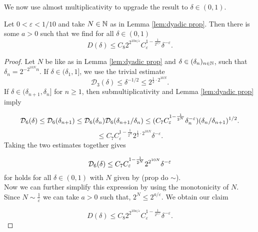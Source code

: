 We now use almost multiplicativity to upgrade the result to $\delta \in(0,1)$. 
\begin{lem}\label{lem:iteration prop}
Let $0<\varepsilon<1/10$ and take $N\in\mathbb{N}$ as in Lemma \ref{lem:dyadic prop}. Then there is some $a >0$ such that we find for all $\delta \in (0,1)$
\begin{equation}
\label{eq:IntermediateResultIIMomentCurve}
D(\delta) \leq C_{8} 2^{2^{10 a/\varepsilon}} C_\varepsilon^{1-\frac{1}{2^{a/\varepsilon}}} \delta^{-\varepsilon}.
\end{equation}
\end{lem}

\begin{proof}
Let $N$ be like as in Lemma \ref{lem:dyadic prop} and $\delta \in (\delta_n)_{n\in\mathbb{N}}$, such that $\delta_n = 2^{-2^{10N}n}$. If $\delta \in (\delta_{1},1]$, we use the trivial estimate
\begin{equation*}
\mathcal{D}_3(\delta) \leq \delta^{-1/2} \leq 2^{\frac{1}{2} \cdot 2^{10N}}.
\end{equation*}
If $\delta \in (\delta_{n+1},\delta_n]$ for $n \geq 1$, then submultiplicativity and Lemma \ref{lem:dyadic prop} imply

\begin{equation}
    \mathcal{D}_6(\delta) \leq \mathcal{D}_6(\delta_{n+1}) \leq \mathcal{D}_6(\delta_n)\mathcal{D}_6(\delta_{n+1}/  \delta_n) \leq (C_{7}C_{\varepsilon}^{1-\frac{1}{2^N}} \delta_{n}^{-\varepsilon})(\delta_n / \delta_{n+1})^{1/2}.
\end{equation}
\begin{equation}
    \leq C_{7}C_{\varepsilon}^{1-\frac{1}{2^N}}2^{\frac{1}{2} \cdot 2^{10N}} \delta^{-\varepsilon}.
\end{equation}
Taking the two estimates together gives

\begin{equation*}
    \mathcal{D}_6(\delta) \leq C_{7}C_{\varepsilon}^{1-\frac{1}{2^N}}2^{ 2^{10N}} \delta^{-\varepsilon}
\end{equation*}
for holds for all $\delta \in (0,1)$ with $N$ given by (prop do $\sim$). \\

Now we can further simplify this expression by using the monotonicity of $N$. Since $N \sim \frac{1}{\varepsilon}$ we can take $a>0$ such that, $2^N \leq 2^{a/\varepsilon}$. We obtain our claim

\begin{equation*}
D(\delta) \leq C_{8} 2^{2^{10 a/\varepsilon}} C_\varepsilon^{1-\frac{1}{2^{a/\varepsilon}}} \delta^{-\varepsilon}.
\end{equation*}
\end{proof}

